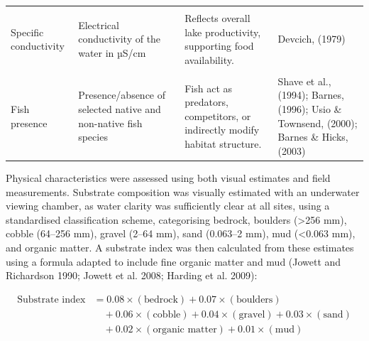 \documentclass[
  12pt,
  a4paper,
  oneside]{scrbook}
\begin{document}
\begin{landscape}
\begin{longtable}[t]{>{\raggedright\arraybackslash}p{2.5cm}>{\raggedright\arraybackslash}p{3.5cm}>{\raggedright\arraybackslash}p{9.5cm}>{\raggedright\arraybackslash}p{5.0cm}}
\cellcolor{gray!8}{Dissolved oxygen} & \cellcolor{gray!8}{Dissolved oxygen concentration in mg/L} & \cellcolor{gray!8}{Essential for respiration; reduced oxygen may constrain activity and habitat use.} & \cellcolor{gray!8}{Hammond et al., (2006); Broughton et al., (2017)}\\
Specific conductivity & Electrical conductivity of the water in µS/cm & Reflects overall lake productivity, supporting food availability. & Devcich, (1979)\\
\addlinespace
\cellcolor{gray!8}{pH} & \cellcolor{gray!8}{Acidity or alkalinity of the water} & \cellcolor{gray!8}{Influences moulting success and exoskeleton strength, affected by acidity or calcium levels.} & \cellcolor{gray!8}{Olsson et al., (2006)}\\
Fish presence & Presence/absence of selected native and non-native fish species & Fish act as predators, competitors, or indirectly modify habitat structure. & Shave et al., (1994); Barnes, (1996); Usio \& Townsend, (2000); Barnes \& Hicks, (2003)\\
\bottomrule

\end{longtable}

\endgroup{}
\end{landscape}

Physical characteristics were assessed using both visual estimates and
field measurements. Substrate composition was visually estimated with an
underwater viewing chamber, as water clarity was sufficiently clear at
all sites, using a standardised classification scheme, categorising
bedrock, boulders (\textgreater256 mm), cobble (64--256 mm), gravel
(2--64 mm), sand (0.063--2 mm), mud (\textless0.063 mm), and organic
matter. A substrate index was then calculated from these estimates using
a formula adapted to include fine organic matter and mud (Jowett and
Richardson 1990; Jowett et al. 2008; Harding et al. 2009):

\[
\begin{aligned}
\text{Substrate index} &= 0.08 \times (\text{bedrock}) + 0.07 \times (\text{boulders}) \\
&\quad + 0.06 \times (\text{cobble}) + 0.04 \times (\text{gravel}) + 0.03 \times (\text{sand}) \\
&\quad + 0.02 \times (\text{organic matter}) + 0.01 \times (\text{mud})
\end{aligned}
\]
\end{document}
